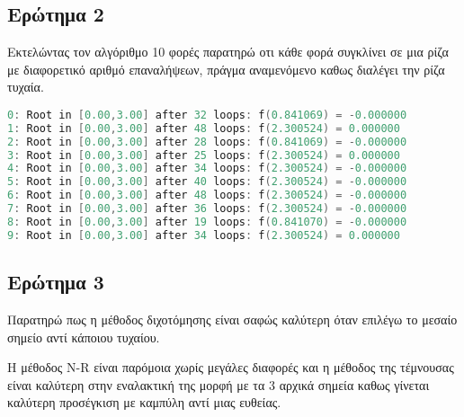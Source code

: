 \subsection{Ερώτημα 2}
Εκτελώντας τον αλγόριθμο 10 φορές παρατηρώ οτι κάθε φορά συγκλίνει σε μια ρίζα
με διαφορετικό αριθμό επαναλήψεων, πράγμα αναμενόμενο καθως
διαλέγει την ρίζα τυχαία.
\begin{lstlisting}[language=C, mathescape=true]
0: Root in [0.00,3.00] after 32 loops: f(0.841069) = -0.000000
1: Root in [0.00,3.00] after 48 loops: f(2.300524) = 0.000000
2: Root in [0.00,3.00] after 28 loops: f(0.841069) = -0.000000
3: Root in [0.00,3.00] after 25 loops: f(2.300524) = 0.000000
4: Root in [0.00,3.00] after 34 loops: f(2.300524) = -0.000000
5: Root in [0.00,3.00] after 40 loops: f(2.300524) = -0.000000
6: Root in [0.00,3.00] after 48 loops: f(2.300524) = -0.000000
7: Root in [0.00,3.00] after 36 loops: f(2.300524) = -0.000000
8: Root in [0.00,3.00] after 19 loops: f(0.841070) = -0.000000
9: Root in [0.00,3.00] after 34 loops: f(2.300524) = 0.000000
\end{lstlisting}

\subsection{Ερώτημα 3}

Παρατηρώ πως η μέθοδος διχοτόμησης είναι σαφώς καλύτερη όταν επιλέγω το μεσαίο
σημείο αντί κάποιου τυχαίου.

Η μέθοδος N-R είναι παρόμοια χωρίς μεγάλες διαφορές και η μέθοδος της
τέμνουσας είναι καλύτερη στην εναλακτική της μορφή με τα 3 αρχικά σημεία
καθως γίνεται καλύτερη προσέγκιση με καμπύλη αντί μιας ευθείας.

